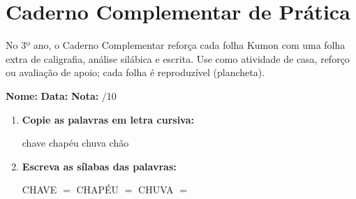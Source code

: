 
\chapter{Caderno Complementar de Prática}

No 3º ano, o Caderno Complementar reforça cada folha Kumon com uma folha extra de caligrafia, análise silábica e escrita. Use como atividade de casa, reforço ou avaliação de apoio; cada folha é reproduzível (plancheta).



\begin{exercicio}



\noindent\textbf{Nome:} \underline{\hspace{3.2cm}} \quad \textbf{Data:} \underline{\hspace{1.6cm}} \quad \textbf{Nota:} \underline{\hspace{0.9cm}}/10


\begin{enumerate}

  \item \textbf{Copie as palavras em letra cursiva:}
  \begin{center}
  chave \quad chapéu \quad chuva \quad chão
  \end{center}
  \begin{center}
  \underline{\hspace{2.4cm}} \quad \underline{\hspace{2.4cm}} \quad \underline{\hspace{2.4cm}} \quad \underline{\hspace{2.4cm}}
  \end{center}

  \item \textbf{Escreva as sílabas das palavras:}
  \begin{center}
  CHAVE $=$ \underline{\hspace{1.5cm}} \underline{\hspace{1.5cm}} \quad CHAPÉU $=$ \underline{\hspace{1.5cm}} \underline{\hspace{1.5cm}} \quad CHUVA $=$ \underline{\hspace{1.5cm}} \underline{\hspace{1.5cm}}
  \end{center}


\end{enumerate}
\end{exercicio}
